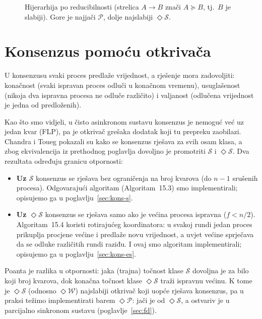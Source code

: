 \documentclass[11pt,a4paper]{article}
\newcommand{\Dp}{\ensuremath{\mathcal{P}}}
\newcommand{\Ds}{\ensuremath{\mathcal{S}}}
\newcommand{\Dw}{\ensuremath{\mathcal{W}}}
\newcommand{\Dv}{\ensuremath{\mathcal{V}}}
\newcommand{\eP}{\ensuremath{\Diamond\mathcal{P}}}
\newcommand{\eS}{\ensuremath{\Diamond\mathcal{S}}}
\newcommand{\eW}{\ensuremath{\Diamond\mathcal{W}}}
\newcommand{\eV}{\ensuremath{\Diamond\mathcal{V}}}
\begin{document}
\begin{figure}[h]
\centering
{}
\caption{Hijerarhija po reducibilnosti (strelica $A \to B$ znači $A \succeq B$,
tj.\ $B$ je slabiji). Gore je najjači \Dp, dolje najslabiji \eS.}
\label{fig:hijerarhija}
\end{figure}

\section{Konsenzus pomoću otkrivača}

U konsenzusu svaki proces predlaže vrijednost, a rješenje mora zadovoljiti:
konačnost (svaki ispravan proces odluči u konačnom vremenu), usuglašenost
(nikoja dva ispravna procesa ne odluče različito) i valjanost (odlučena
vrijednost je jedna od predloženih).

Kao što smo vidjeli, u čisto asinkronom sustavu konsenzus je nemoguć već uz jedan
kvar (FLP), pa je otkrivač grešaka dodatak koji tu prepreku zaobilazi. Chandra i
Toueg pokazali su kako se konsenzus rješava za svih osam klasa, a zbog
ekvivalencija iz prethodnog poglavlja dovoljno je promotriti $\Ds$ i $\eS$. Dva
rezultata određuju granicu otpornosti:

\begin{itemize}
  \item \textbf{Uz \Ds{}} konsenzus se rješava bez ograničenja na broj kvarova
  (do $n-1$ srušenih procesa). Odgovarajući algoritam (Algoritam~15.3) smo
  implementirali; opisujemo ga u poglavlju~\ref{sec:kons-s}.
  \item \textbf{Uz \eS{}} konsenzus se rješava samo ako je većina procesa
  ispravna ($f < n/2$). Algoritam~15.4 koristi rotirajućeg koordinatora: u svakoj
  rundi jedan proces prikuplja procjene većine i predlaže novu vrijednost, a
  uvjet većine sprječava da se odluke različitih rundi raziđu. I ovaj smo
  algoritam implementirali; opisujemo ga u poglavlju~\ref{sec:kons-es}.
\end{itemize}

Poanta je razlika u otpornosti: jaka (trajna) točnost klase $\Ds$ dovoljna je za
bilo koji broj kvarova, dok konačna točnost klase $\eS$ traži ispravnu većinu. K
tome je $\eS$ (odnosno $\eW$) najslabiji otkrivač koji uopće rješava konsenzus,
pa u praksi težimo implementirati barem $\eP$: jači je od $\eS$, a ostvariv je u
parcijalno sinkronom sustavu (poglavlje~\ref{sec:fd}).
\end{document}
